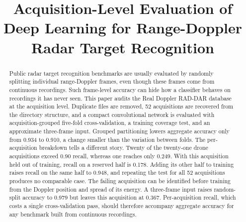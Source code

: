 \documentclass{ICIC2026}
\begin{document}
\title{Acquisition-Level Evaluation of Deep Learning for Range-Doppler Radar Target Recognition}

\newif\ifblind
\blindfalse

\ifblind
  \newcommand{\codeurl}{a repository archived with the submission}
  \author{}
\else
  \newcommand{\codeurl}{\url{github.com/falcon-colab/rdrd-acquisition-coverage}}
  \author{%
  \ICICAuthorRowThree
    {}
    {}
    {}
  \ICICAuthorRowTwo
    {}
    {}
  }
\fi

\maketitle

\begin{abstract}
Public radar target recognition benchmarks are usually evaluated by randomly splitting individual range-Doppler frames, even though these frames come from continuous recordings. Such frame-level accuracy can hide how a classifier behaves on recordings it has never seen. This paper audits the Real Doppler RAD-DAR database at the acquisition level. Duplicate files are removed, 52 acquisitions are recovered from the directory structure, and a compact convolutional network is evaluated with acquisition-grouped five-fold cross-validation, a training coverage test, and an approximate three-frame input. Grouped partitioning lowers aggregate accuracy only from 0.934 to 0.910, a change smaller than the variation between folds. The per-acquisition breakdown tells a different story. Twenty of the twenty-one drone acquisitions exceed 0.90 recall, whereas one reaches only 0.249. With this acquisition held out of training, recall on a reserved half is 0.178. Adding its other half to training raises recall on the same half to 0.948, and repeating the test for all 52 acquisitions produces no comparable case. The failing acquisition can be identified before training from the Doppler position and spread of its energy. A three-frame input raises random-split accuracy to 0.979 but leaves this acquisition at 0.367. Per-acquisition recall, which costs a single cross-validation pass, should therefore accompany aggregate accuracy for any benchmark built from continuous recordings.
\end{abstract}
\end{document}
